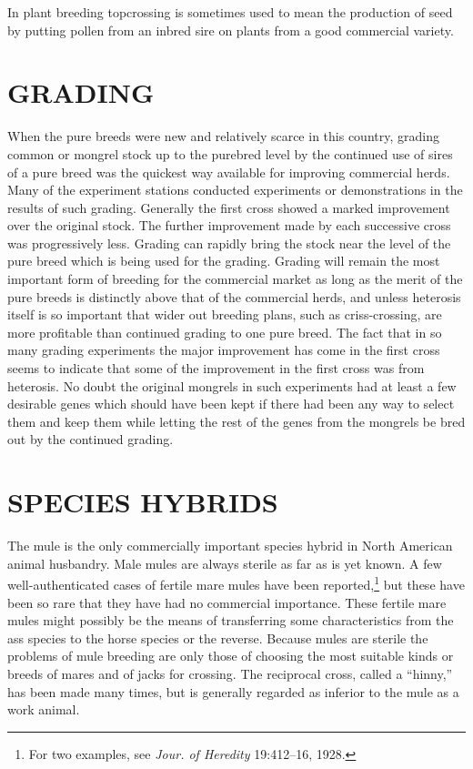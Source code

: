 In plant breeding topcrossing is sometimes used to mean the production
of seed by putting pollen from an inbred sire on plants from a
good commercial variety.

\section*{GRADING}

When the pure breeds were new and relatively scarce in this country,
grading common or mongrel stock up to the purebred level by the
continued use of sires of a pure breed was the quickest way available for
improving commercial herds. Many of the experiment stations conducted
experiments or demonstrations in the results of such grading.
Generally the first cross showed a marked improvement over the original
stock. The further improvement made by each successive cross was
progressively less. Grading can rapidly bring the stock near the level
of the pure breed which is being used for the grading. Grading will
remain the most important form of breeding for the commercial market
as long as the merit of the pure breeds is distinctly above that of
the commercial herds, and unless heterosis itself is so important that
wider out breeding plans, such as criss-crossing, are more profitable than
continued grading to one pure breed. The fact that in so many grading
experiments the major improvement has come in the first cross seems to
indicate that some of the improvement in the first cross was from heterosis.
No doubt the original mongrels in such experiments had at least
a few desirable genes which should have been kept if there had been any
way to select them and keep them while letting the rest of the genes
from the mongrels be bred out by the continued grading.

\section*{SPECIES HYBRIDS}

The mule is the only commercially important species hybrid in
North American animal husbandry. Male mules are always sterile as far
as is yet known. A few well-authenticated cases of fertile mare mules
have been reported,\footnote{For two examples, see \textit{Jour. of
Heredity} 19:412--16, 1928.} but these have been so rare that they have
had no commercial importance. These fertile mare mules might possibly be
the means of transferring some characteristics from the ass species to the
horse species or the reverse. Because mules are sterile the problems of
mule breeding are only those of choosing the most suitable kinds or
breeds of mares and of jacks for crossing. The reciprocal cross, called a
``hinny,'' has been made many times, but is generally regarded as inferior
to the mule as a work animal.

